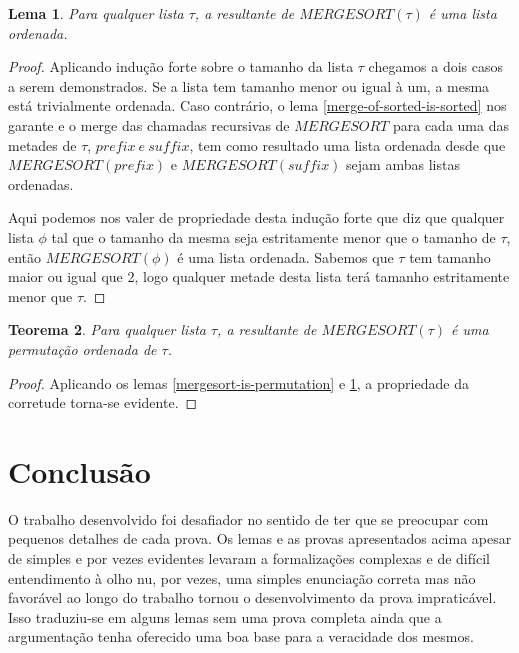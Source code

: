 \documentclass[12pt]{article}
\newtheorem{theorem}{Teorema}[section]
\newtheorem{lemma}[theorem]{Lema}
\theoremstyle{definition}
\begin{document}
\begin{lemma}
\label{mergesort-sorts}
        Para qualquer lista $\tau$, a resultante de $MERGESORT(\tau)$ é uma lista ordenada.
\end{lemma}

\begin{proof}
        Aplicando indução forte sobre o tamanho da lista $\tau$ chegamos a dois casos a serem demonstrados.
        Se a lista tem tamanho menor ou igual à um, a mesma está trivialmente ordenada. Caso contrário,
        o lema \ref{merge-of-sorted-is-sorted} nos garante e o merge das chamadas recursivas de $MERGESORT$
        para cada uma das metades de $\tau$, $prefix\ e\ suffix$,  tem como resultado uma lista ordenada
        desde que $MERGESORT(prefix)$ e $MERGESORT(suffix)$ sejam ambas listas ordenadas.

        Aqui podemos nos valer de propriedade desta indução forte que diz que qualquer lista $\phi$ tal que
        o tamanho da mesma seja estritamente menor que o tamanho de $\tau$, então $MERGESORT(\phi)$ é uma lista
        ordenada. Sabemos que $\tau$ tem tamanho maior ou igual que 2, logo qualquer metade desta lista
        terá tamanho estritamente menor que $\tau$.
\end{proof}

\begin{theorem}
\label{mergesort-is-correct}
        Para qualquer lista $\tau$, a resultante de $MERGESORT(\tau)$ é uma permutação ordenada de $\tau$.
\end{theorem}

\begin{proof}
        Aplicando os lemas \ref{mergesort-is-permutation} e \ref{mergesort-sorts}, a propriedade da corretude torna-se
        evidente.
\end{proof}



\section{Conclusão}
\label{conclusion}

O trabalho desenvolvido foi desafiador no sentido de ter que se preocupar com pequenos detalhes de cada prova. 
Os lemas e as provas apresentados acima apesar de simples e por vezes evidentes levaram a formalizações
complexas e de difícil entendimento à olho nu, por vezes, uma simples enunciação correta mas não favorável
ao longo do trabalho tornou o desenvolvimento da prova impraticável. Isso traduziu-se em alguns lemas
sem uma prova completa ainda que a argumentação tenha oferecido uma boa base para a veracidade dos mesmos.
\end{document}
